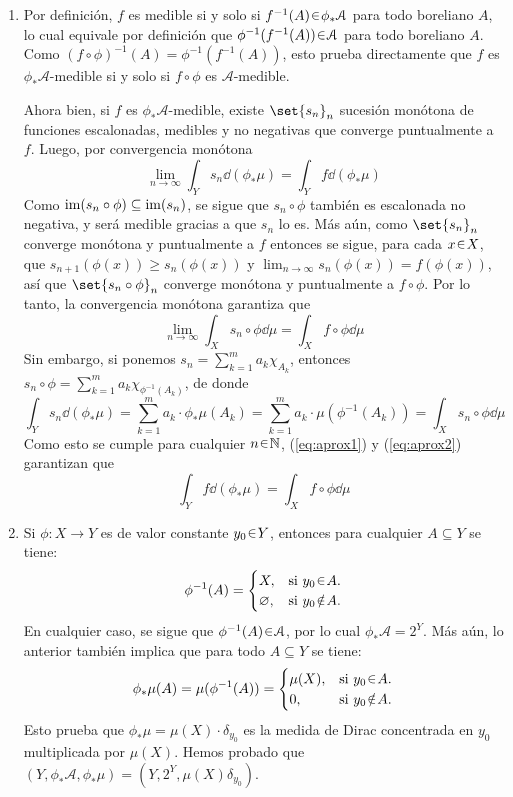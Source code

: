 \begin{sol}
\begin{enumerate}[label = (\roman*)]
\item %
Por definición, $f$ es medible si y solo si $f^{-1}(A) \en \phi_*\mathcal{A}$ para todo boreliano $A$, lo cual equivale por definición que $\phi^{-1}(f^{-1}(A))\en\mathcal{A}$ para todo boreliano $A$. Como $(f\circ\phi)^{-1}(A) = \phi^{-1}(f^{-1}(A))$, esto prueba directamente que $f$ es $\phi_*\mathcal{A}$-medible si y solo si $f\circ\phi$ es $\mathcal{A}$-medible.\par
Ahora bien, si $f$ es $\phi_*\mathcal{A}$-medible, existe $\set{s_n}_{n}$ sucesión monótona de funciones escalonadas, medibles y no negativas que converge puntualmente a $f$. Luego, por convergencia monótona
\begin{equation}\label{eq:aprox1}
\lim_{n\to\infty}\int_Y s_n \dd{(\phi_*\mu)} = \int_Y f \dd{(\phi_*\mu)}
\end{equation}
Como $\operatorname{im}(s_n \circ \phi) \subseteq \operatorname{im}(s_n)$, se sigue que $s_n\circ\phi$ también es escalonada no negativa, y será medible gracias a que $s_n$ lo es. Más aún, como $\set{s_n}_n$ converge monótona y puntualmente a $f$ entonces se sigue, para cada $x\en X$, que $s_{n+1}(\phi(x)) \ge s_n(\phi(x))$ y $\lim_{n\to\infty} s_n(\phi(x)) = f(\phi(x))$, así que $\set{s_n\circ\phi}_n$ converge monótona y puntualmente a $f \circ \phi$. Por lo tanto, la convergencia monótona garantiza que 
\begin{equation}\label{eq:aprox2}
\lim_{n\to\infty}\int_X s_n\circ\phi \dd{\mu} = \int_X f\circ\phi \dd{\mu}
\end{equation}
Sin embargo, si ponemos $s_n = \sum^{m}_{k=1}a_k\chi_{A_k}$, entonces $s_n\circ\phi = \sum^m_{k=1}a_k\chi_{\phi^{-1}(A_k)}$, de donde
\[
\int_Y s_n \dd{(\phi_*\mu)}
= \sum^m_{k=1} a_k \cdot\phi_*\mu(A_k)
= \sum^m_{k=1} a_k \cdot\mu(\phi^{-1}(A_k))
= \int_X s_n \circ \phi \dd{\mu}
\]
Como esto se cumple para cualquier $n\en\mathbb{N}$, (\ref{eq:aprox1}) y (\ref{eq:aprox2}) garantizan que
\[
\int_Y f \dd{(\phi_*\mu)} = \int_X f\circ\phi \dd{\mu}
\]
\item %
Si $\phi\colon X\to Y$ es de valor constante $y_0\en Y$, entonces para cualquier $A\subseteq Y$ se tiene:
\[
\phi^{-1}(A)
= 
\begin{cases}
    X,           &\text{si }y_0\en A.\\
    \varnothing, &\text{si }y_0\noten A.
\end{cases}
\]
En cualquier caso, se sigue que $\phi^{-1}(A)\en\mathcal{A}$, por lo cual $\phi_*\mathcal{A} = 2^Y$. Más aún, lo anterior también implica que para todo $A \subseteq Y$ se tiene:
\[
\phi_*\mu(A) = \mu(\phi^{-1}(A))
=
\begin{cases}
    \mu(X), &\text{si } y_0 \en A.\\
    0,      &\text{si } y_0 \noten A.
\end{cases}
\]
Esto prueba que $\phi_*\mu = \mu(X)\cdot\delta_{y_0}$ es la medida de Dirac concentrada en $y_0$ multiplicada por $\mu(X)$. Hemos probado que $(Y,\phi_*\mathcal{A},\phi_*\mu) = (Y,2^Y,\mu(X)\delta_{y_0})$.
\end{enumerate}
\end{sol}